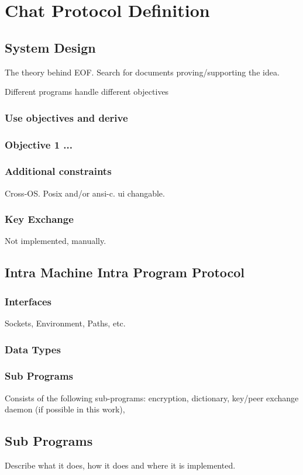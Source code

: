 \section{Chat Protocol Definition}
\subsection{System Design}
The theory behind EOF.
Search for documents proving/supporting the idea.

Different programs handle different objectives
\subsubsection{Use objectives and derive}
\subsubsection{Objective 1 ...}
\subsubsection{Additional constraints}
Cross-OS. Posix and/or ansi-c. ui changable.
\subsubsection{Key Exchange}
Not implemented, manually.
\subsection{Intra Machine Intra Program Protocol}
\subsubsection{Interfaces}
Sockets, Environment, Paths, etc.
\subsubsection{Data Types}
\subsubsection{Sub Programs}
Consists of the following sub-programs:
encryption, dictionary, key/peer exchange daemon (if possible in this work),
\subsection{Sub Programs}
Describe what it does, how it does and where it is implemented.
